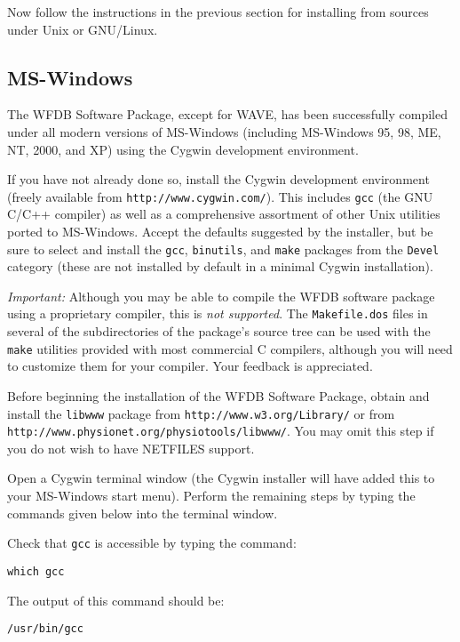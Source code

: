 \documentclass[twoside]{article}
\begin{document}
Now follow the instructions in the previous section for installing from sources
under Unix or GNU/Linux.

\subsection*{MS-Windows}

The WFDB Software Package, except for WAVE, has been successfully compiled
under all modern versions of MS-Windows (including MS-Windows 95, 98, ME, NT,
2000, and XP) using the Cygwin development environment.

If you have not already done so, install the Cygwin development environment
(freely available from {\tt http://\-www.\-cygwin.\-com/}).  This includes
{\tt gcc} (the GNU C/C++ compiler) as well as a comprehensive assortment of
other Unix utilities ported to MS-Windows.  Accept the defaults suggested by
the installer,  but be sure to select and install the {\tt gcc},
{\tt binutils}, and {\tt make} packages from the {\tt Devel} category
(these are not installed by default in a minimal Cygwin installation).

\emph{Important:} Although you may be able to compile the WFDB software
package using a proprietary compiler, this is \emph{not supported}.  The
{\tt Makefile.dos} files in several of the subdirectories of the package's
source tree can be used with the {\tt make} utilities provided with most
commercial C compilers, although you will need to customize them for your
compiler. Your feedback is appreciated.

Before beginning the installation of the WFDB Software Package, obtain and
install the {\tt libwww} package from {\tt http://www.w3.org/Library/} or
from {\tt http://\-www.physio\-net.org/physio\-tools/libwww/}.  You may
omit this step if you do not wish to have NETFILES support.

Open a Cygwin terminal window (the Cygwin installer will have added this to
your MS-Windows start menu).  Perform the remaining steps by typing the
commands given below into the terminal window.

Check that {\tt gcc} is accessible by typing the command:

\begin{verbatim}
which gcc
\end{verbatim}

The output of this command should be:

\begin{verbatim}
/usr/bin/gcc
\end{verbatim}
\end{document}
